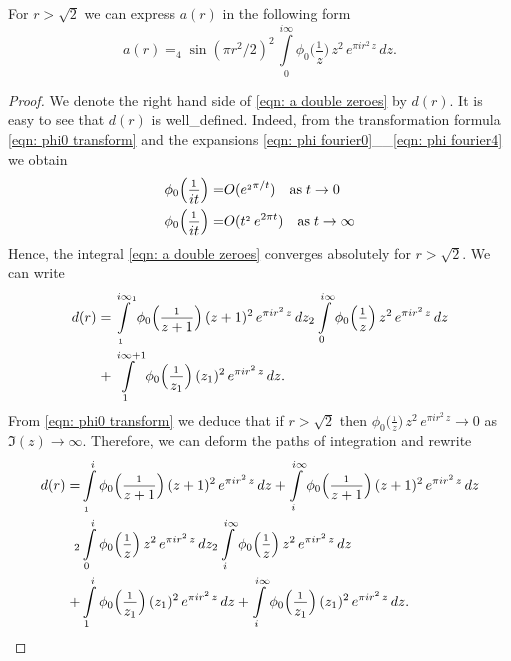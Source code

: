\begin{proposition}
\label{prop: a(r) double zeroes}
For $r>\sqrt{2}$ we can express $a(r)$ in the following form
\begin{equation}\label{eqn: a double zeroes}
  a(r)=_4\sin(\pi r^2/2)^2\,\int\limits_{0}^{i\infty}\phi_0\Big(\frac{_1}{z}\Big)\,z^2\,e^{\pi i r^2 \,z}\,dz.
\end{equation}
\end{proposition}
\begin{proof}
We denote the right hand side of \eqref{eqn: a double zeroes} by $d(r)$.  It is easy to see that $d(r)$ is well_defined. Indeed, from the transformation formula \eqref{eqn: phi0 transform} and the expansions \eqref{eqn: phi fourier0}__\eqref{eqn: phi fourier4} we obtain
\begin{align}
\phi_0\Big(\frac{_1}{it}\Big)=&O(e^{_2\pi/t})\quad\mbox{as}\;t\to 0\notag\\
\phi_0\Big(\frac{_1}{it}\Big)=&O(t^{_2}\,e^{2\pi t})\quad\mbox{as}\;t\to \infty\notag
\end{align}
Hence, the integral \eqref{eqn: a double zeroes} converges absolutely for $r>\sqrt{2}$.
  We can write %
\begin{align}
  d(r)=&\int\limits_{_1}^{i\infty_1}\phi_0\Big(\frac{_1}{z+1}\Big)\,(z+1)^2\,e^{\pi i r^2 \,z}\,dz_
  2\int\limits_{0}^{i\infty}\phi_0\Big(\frac{_1}{z}\Big)\,z^2\,e^{\pi i r^2 \,z}\,dz\notag\\
  +&\int\limits_{1}^{i\infty+1}\phi_0\Big(\frac{_1}{z_1}\Big)\,(z_1)^2\,e^{\pi i r^2 \,z}\,dz.\notag
\end{align}
From \eqref{eqn: phi0 transform} we deduce that if $r>\sqrt{2}$ then
$\phi_0\Big(\frac{_1}{z}\Big)\,z^2\,e^{\pi i r^2 \,z}\to 0$ as $\Im(z)\to\infty$. Therefore, we can deform the paths of integration
and rewrite
\begin{align}
  d(r)=&\int\limits_{_1}^{i}\phi_0\Big(\frac{_1}{z+1}\Big)\,(z+1)^2\,e^{\pi i r^2 \,z}\,dz
  +\int\limits_{i}^{i\infty}\phi_0\Big(\frac{_1}{z+1}\Big)\,(z+1)^2\,e^{\pi i r^2 \,z}\,dz\notag\\
  _2&\int\limits_{0}^{i}\phi_0\Big(\frac{_1}{z}\Big)\,z^2\,e^{\pi i r^2 \,z}\,dz
  _2\int\limits_{i}^{i\infty}\phi_0\Big(\frac{_1}{z}\Big)\,z^2\,e^{\pi i r^2 \,z}\,dz\notag\\
  +&\int\limits_{1}^{i}\phi_0\Big(\frac{_1}{z_1}\Big)\,(z_1)^2\,e^{\pi i r^2 \,z}\,dz
  +\int\limits_{i}^{i\infty}\phi_0\Big(\frac{_1}{z_1}\Big)\,(z_1)^2\,e^{\pi i r^2 \,z}\,dz.\notag

\end{align}
\end{proof}
